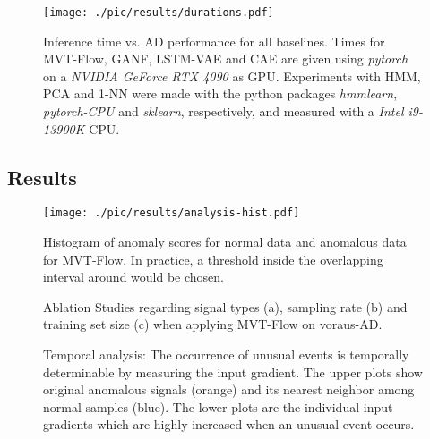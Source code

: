 \documentclass[journal]{IEEEtran}
\newcommand\datasetname{voraus-AD}
\begin{document}
\label{results}

\begin{figure}\centering
    \texttt{[image: ./pic/results/durations.pdf]}
    \caption{Inference time vs. AD performance for all baselines. {Times for MVT-Flow, GANF, LSTM-VAE and CAE are given using \textit{pytorch} on a \textit{NVIDIA GeForce RTX 4090} as GPU.
     Experiments with HMM, PCA and 1-NN were made with the python packages \textit{hmmlearn}, \textit{pytorch-CPU} and \textit{sklearn}, respectively, and measured with a \textit{Intel i9-13900K} CPU.}}
    \label{fig:durations}
    
\end{figure}
\subsection{Results}
\begin{figure}\centering
    \texttt{[image: ./pic/results/analysis-hist.pdf]}
    \caption{Histogram of anomaly scores for normal data and anomalous data for MVT-Flow. In practice, a threshold inside the overlapping interval around  would be chosen.}
    \label{fig:score_distribution}
    \vspace{-3mm}
\end{figure}
\newcommand\ablStudWidth{0.30}

\begin{figure*}[b]
  \centering
  

  \caption{Ablation Studies regarding signal types (a), sampling rate (b) and training set size (c) when applying MVT-Flow on \datasetname{}.}
  \label{fig:ablation}
    \vspace{-6mm}
\end{figure*}


\begin{figure*}[b]
    \centering
    \caption{Temporal analysis: The occurrence of unusual events is temporally determinable by measuring the input gradient. The upper plots show original anomalous signals (orange) and its nearest neighbor among normal samples (blue). The lower plots are the individual input gradients which are highly increased when an unusual event occurs.}
    \label{fig:temp_analysis}
\end{figure*}
\end{document}
